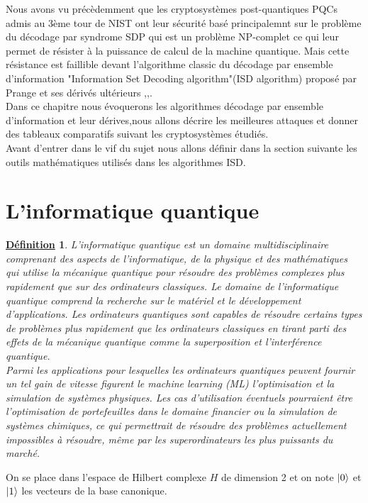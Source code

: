 \documentclass[12pt,openany]{report}
\newtheorem{definition}{\underline{Définition}}
\DeclarePairedDelimiter\ket{\lvert}{\rangle}
\begin{document}
Nous avons vu précèdemment que les cryptosystèmes post-quantiques PQCs admis au 3ème tour de NIST ont leur sécurité basé principalemnt sur le problème du décodage par syndrome SDP qui est un problème NP-complet ce qui leur permet de résister à la puissance de calcul de la machine quantique. Mais cette résistance est faillible devant l'algorithme classic du décodage par ensemble d'information "Information Set Decoding algorithm"(ISD algorithm) proposé par Prange \cite{Prange23} et ses dérivés ultérieurs \cite{Over22},\cite{Mo19},\cite{Berst5}.\\
Dans ce chapitre nous évoquerons les algorithmes  décodage par ensemble d'information et leur dérives,nous allons décrire les meilleures attaques et donner des tableaux comparatifs suivant les cryptosystèmes étudiés.\\
Avant d'entrer dans le vif du sujet nous allons définir dans la section suivante les outils mathématiques utilisés dans les algorithmes ISD.
\section{L'informatique quantique} 
\begin{definition}

L'informatique quantique est un domaine multidisciplinaire comprenant des aspects de l'informatique, de la physique et des mathématiques qui utilise la mécanique quantique pour résoudre des problèmes complexes plus rapidement que sur des ordinateurs classiques. Le domaine de l'informatique quantique comprend la recherche sur le matériel et le développement d'applications. Les ordinateurs quantiques sont capables de résoudre certains types de problèmes plus rapidement que les ordinateurs classiques en tirant parti des effets de la mécanique quantique comme la superposition et l'interférence quantique.\cite{ama}\\
 Parmi les applications pour lesquelles les ordinateurs quantiques peuvent fournir un tel gain de vitesse figurent le machine learning (ML) l'optimisation et la simulation de systèmes physiques. Les cas d'utilisation éventuels pourraient être l'optimisation de portefeuilles dans le domaine financier ou la simulation de systèmes chimiques, ce qui permettrait de résoudre des problèmes actuellement impossibles à résoudre, même par les superordinateurs les plus puissants du marché.

\end{definition}

On se place dans l'espace de Hilbert complexe $\mathit{H}$  de dimension 2 et on note $ \ket{0} $ et $\ket{1} $ les vecteurs de la base canonique.\cite{Arnaud}
\end{document}
